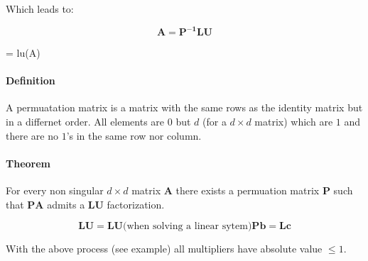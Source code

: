 Which leads to:

\[
	\mathbf{A} = \mathbf{P^{-1}LU}
\]

\begin{Matlab}
	[L, U, P] = lu(A)
\end{Matlab}

\paragraph{Definition} A permuatation matrix is a matrix with the same rows as
the identity matrix but in a differnet order. All elements are $0$ but $d$ (for
a $d \times d$ matrix) which are $1$ and there are no $1$'s in the same row nor
column.

\paragraph{Theorem} For every non singular $d \times d$ matrix $\mathbf{A}$ there
exists a permuation matrix $\mathbf{P}$ such that $\mathbf{PA}$ admits a 
$\mathbf{LU}$ factorization.

\[
	\mathbf{LU} = \mathbf{LU} \text{(when solving a linear sytem} \text{)}
	 	\mathbf{Pb} = \mathbf{Lc}
\]

With the above process (see example) all multipliers have absolute value $\leq 1$.